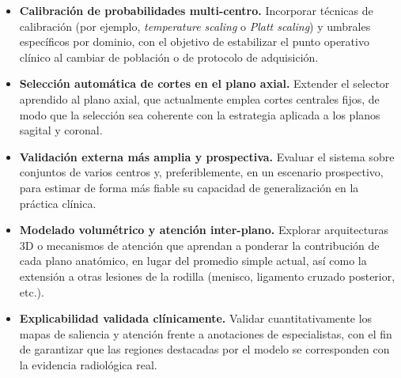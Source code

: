 \begin{itemize}
    \item \textbf{Calibración de probabilidades multi-centro.} Incorporar técnicas de calibración (por ejemplo, \textit{temperature scaling} o \textit{Platt scaling}) y umbrales específicos por dominio, con el objetivo de estabilizar el punto operativo clínico al cambiar de población o de protocolo de adquisición.

    \item \textbf{Selección automática de cortes en el plano axial.} Extender el selector aprendido al plano axial, que actualmente emplea cortes centrales fijos, de modo que la selección sea coherente con la estrategia aplicada a los planos sagital y coronal.

    \item \textbf{Validación externa más amplia y prospectiva.} Evaluar el sistema sobre conjuntos de varios centros y, preferiblemente, en un escenario prospectivo, para estimar de forma más fiable su capacidad de generalización en la práctica clínica.

    \item \textbf{Modelado volumétrico y atención inter-plano.} Explorar arquitecturas 3D o mecanismos de atención que aprendan a ponderar la contribución de cada plano anatómico, en lugar del promedio simple actual, así como la extensión a otras lesiones de la rodilla (menisco, ligamento cruzado posterior, etc.).

    \item \textbf{Explicabilidad validada clínicamente.} Validar cuantitativamente los mapas de saliencia y atención frente a anotaciones de especialistas, con el fin de garantizar que las regiones destacadas por el modelo se corresponden con la evidencia radiológica real.
\end{itemize}
